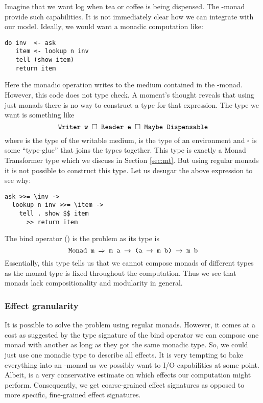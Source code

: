 Imagine that we want log when tea or coffee is being dispensed. The -monad provide such capabilities. It is not immediately clear how we can integrate  with our model. Ideally, we would want  a monadic computation like:
\begin{lstlisting}[style={haskell}]
do inv  <- ask
   item <- lookup n inv
   tell (show item)
   return item
\end{lstlisting}
Here the monadic operation  writes to the medium contained in the -monad.
However, this code does not type check. A moment's thought reveals that using just monads there is no way to construct a type for that expression. The type we want is something like
\[ \texttt{Writer w $\square$ Reader e $\square$ Maybe Dispensable} \]
where  is the type of the writable medium,  is the type of an environment and $\square$ is some ``type-glue'' that joins the types together. This type is exactly a Monad Transformer type which we discuss in Section \ref{sec:mt}. But using regular monads it is not possible to construct this type. Let us desugar the above expression to see why:
\begin{lstlisting}[style={haskell}]
ask >>= \inv -> 
  lookup n inv >>= \item -> 
    tell . show $$ item 
      >> return item
\end{lstlisting}
The bind operator (\code{>>=}) is the problem as its type is
\[ \texttt{Monad m $\Rightarrow$ m a $\to$ (a $\to$ m b) $\to$ m b} \]
Essentially, this type tells us that we cannot compose monads of different types as the monad type  is fixed throughout the computation. Thus we see that monads lack compositionality and modularity in general.

\subsubsection{Effect granularity}%
It is possible to solve the problem using regular monads. However, it comes at a cost as suggested by the type signature of the bind operator we can compose one monad with another as long as they got the same monadic type. So, we could just use one monadic type to describe all effects. It is very tempting to bake everything into an -monad as we possibly want to I/O capabilities at some point. Albeit,  is a very conservative estimate on which effects our computation might perform. Consequently, we get coarse-grained effect signatures as opposed to more specific, fine-grained effect signatures.

